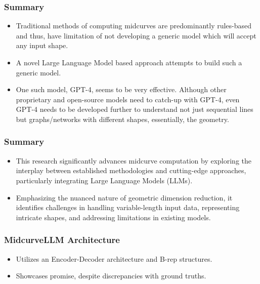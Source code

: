 \begin{frame}[fragile]\frametitle{Summary}
	\begin{itemize}
	\item Traditional methods of computing midcurves are predominantly rules-based and thus, have limitation of not developing a generic model which will accept any input shape. 	
	\item A novel Large Language Model based approach attempts to build such a generic model. 
	\item One such model, GPT-4, seems to be very effective. Although other proprietary and open-source models need to catch-up with GPT-4, even GPT-4 needs to be developed further to understand not just sequential lines but graphs/networks with different shapes, essentially, the geometry.  
	\end{itemize}	
\end{frame}


\begin{frame}[fragile]\frametitle{Summary}
    \begin{itemize}
        \item This research significantly advances midcurve computation by exploring the interplay between established methodologies and cutting-edge approaches, particularly integrating Large Language Models (LLMs).
        \item Emphasizing the nuanced nature of geometric dimension reduction, it identifies challenges in handling variable-length input data, representing intricate shapes, and addressing limitations in existing models.
    \end{itemize}
    
\end{frame}

\begin{frame}[fragile]\frametitle{MidcurveLLM Architecture}

    \begin{itemize}
        \item Utilizes an Encoder-Decoder architecture and B-rep structures.
        \item Showcases promise, despite discrepancies with ground truths.
    \end{itemize}
    

\end{frame}


